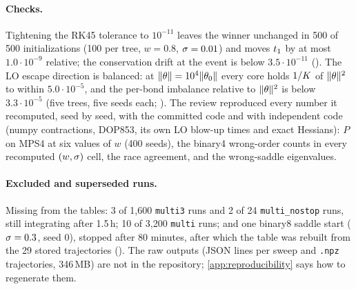 \paragraph{Checks.}
Tightening the RK45 tolerance to $10^{-11}$ leaves the winner unchanged in 500 of 500 initializations (100 per tree,
$w=0.8$, $\sigma=0.01$) and moves $t_{1}$ by at most $1.0\cdot10^{-9}$ relative; the conservation drift at the event
is below $3.5\cdot10^{-11}$ (). The LO escape direction is balanced: at
$\lVert\theta\rVert=10^4\lVert\theta_0\rVert$ every core holds $1/K$ of $\lVert\theta\rVert^2$ to within $5.0\cdot10^{-5}$, and the
per-bond imbalance relative to $\lVert\theta\rVert^2$ is below $3.3\cdot10^{-5}$ (five trees, five seeds each;
). The review reproduced every number it recomputed, seed by seed, with the committed code
and with independent code (numpy contractions, DOP853, its own LO blow-up times and exact Hessians): $P$ on MPS4 at
six values of $w$ (400 seeds), the binary4 wrong-order counts in every recomputed $(w,\sigma)$ cell, the
race agreement, and the wrong-saddle eigenvalues.

\paragraph{Excluded and superseded runs.}
Missing from the tables: 3 of 1,600 \texttt{multi3} runs and 2 of 24 \texttt{multi\_nostop} runs, still integrating
after 1.5\,h; 10 of 3,200 \texttt{multi} runs; and one binary8 saddle start ($\sigma=0.3$, seed 0), stopped after 80
minutes, after which the table was rebuilt from the 29 stored trajectories (). The raw outputs (JSON lines per
sweep and \texttt{.npz} trajectories, 346\,MB) are not in the repository; \cref{app:reproducibility} says how to
regenerate them.

